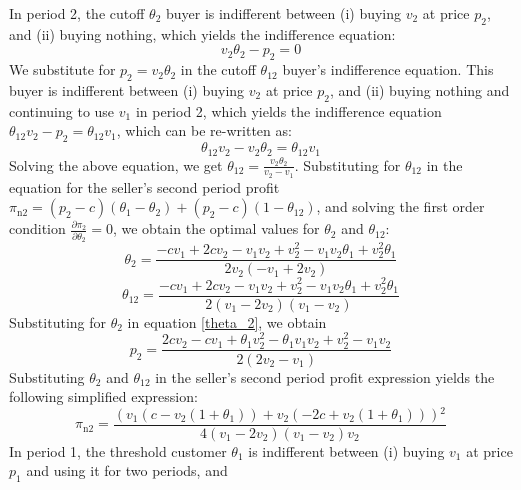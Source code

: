 \documentclass[isre,blindrev]{informs3} %
\begin{document}
 In period 2, the cutoff \(\theta _2\) buyer is indifferent between (i) buying \(v_2\) at price \(p_2\), and (ii) buying nothing, which yields the
indifference equation: 
\begin{equation}\label{theta_2}
v_2 \theta _2-p_2 = 0
\end{equation}
We substitute for \(p_2=v_2\theta _2\) in the cutoff \(\theta _{12}\) buyer{'}s indifference equation. This buyer is indifferent between (i) buying
\(v_2\) at price \(p_2\), and (ii) buying nothing and continuing to use \(v_1\) in period 2, which yields the indifference equation \(\theta _{12}v_2-p_2=\theta
_{12}v_1\), which can be re-written as:
\begin{equation}
\theta _{12}v_2-v_2\theta _2=\theta _{12}v_1
\end{equation}
Solving the above equation, we get \(\theta _{12}=\frac{v_2 \theta _2}{v_2-v_1}\). Substituting for \(\theta _{12}\) in the equation for the seller{'}s
second period profit \(\pi _{\text{n2}}=\left(p_2-c\right)\left(\theta _1-\theta _2\right)+\left(p_2-c\right)\left(1-\theta _{12}\right)\), and solving
the first order condition \(\frac{\partial \pi _2}{\partial \theta _2}=0\), we obtain the optimal values for \(\theta _2\) and \(\theta _{12}\):
\begin{equation}\label{th_2_innov_no_degrade}
\theta _2=\frac{-c v_1+2 c v_2-v_1 v_2+v_2^2-v_1 v_2 \theta _1+v_2^2 \theta _1}{2 v_2 \left(-v_1+2 v_2\right)}
\end{equation}
\begin{equation}
\theta _{12}=\frac{-c v_1+2 c v_2-v_1 v_2+v_2^2-v_1 v_2 \theta _1+v_2^2 \theta _1}{2 \left(v_1-2 v_2\right) \left(v_1-v_2\right)}
\end{equation}
Substituting for \(\theta _2\) in equation \ref{theta_2}, we obtain 
\begin{equation}\label{p_2_no_degrade}
p_2 = \frac{2 c v_2-c v_1+\theta _1 v_2^2-\theta _1 v_1 v_2+v_2^2-v_1 v_2}{2
   \left(2 v_2-v_1\right)}
\end{equation}
Substituting \(\theta _2\) and \(\theta _{12}\) in the seller{'}s second period profit expression yields the following simplified expression:
\begin{equation}\label{pi_n2_innov_no_degrade}
\pi _{\text{n2}}=\frac{\left(v_1 \left(c-v_2 \left(1+\theta _1\right)\right)+v_2 \left(-2 c+v_2 \left(1+\theta _1\right)\right)\right){}^2}{4 \left(v_1-2
v_2\right) \left(v_1-v_2\right) v_2}
\end{equation}
In period 1, the threshold customer \(\theta _1\) is { }indifferent between (i) buying \(v_1\) at price \(p_1\) and using it for two periods, and
\end{document}
